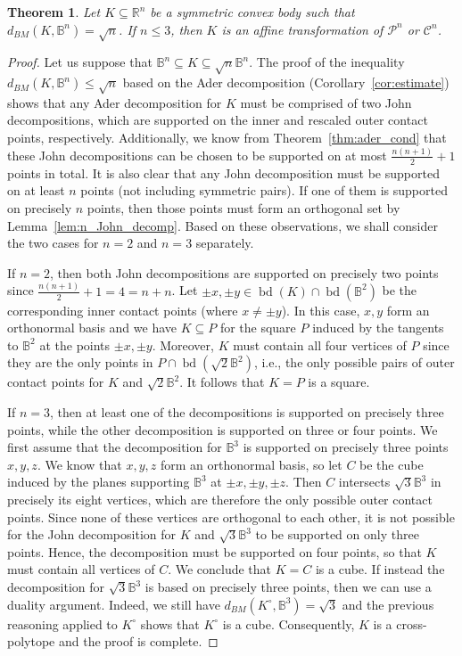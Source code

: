 \documentclass[12pt,a4paper]{article}
\newtheorem{twr}{Theorem}[section]
\theoremstyle{definition}
\DeclareMathOperator{\bd}{bd}
\newcommand\R{\mathbb{R}}
\newcommand\B{\mathbb{B}}
\newcommand\CC{\mathcal{C}}
\newcommand\CP{\mathcal{P}}
\begin{document}
\begin{twr}
\label{thm:eqcase}
Let $K \subseteq \R^n$ be a symmetric convex body such that $d_{BM}(K, \B^n)=\sqrt{n}$. If $n \leq 3$, then $K$ is an affine transformation of $\CP^n$ or $\CC^n$.
\end{twr}
\begin{proof}
Let us suppose that $\B^n \subseteq K \subseteq \sqrt{n}\B^n$. The proof of the inequality $d_{BM}(K,\B^n) \leq \sqrt{n}$ based on the Ader decomposition (Corollary~\ref{cor:estimate}) shows that any Ader decomposition for $K$ must be comprised of two John decompositions, which are supported on the inner and rescaled outer contact points, respectively. Additionally, we know from Theorem~\ref{thm:ader_cond} that these John decompositions can be chosen to be supported on at most $\frac{n(n+1)}{2} + 1$ points in total. It is also clear that any John decomposition must be supported on at least $n$ points (not including symmetric pairs). If one of them is supported on precisely $n$ points, then those points must form an orthogonal set by Lemma~\ref{lem:n_John_decomp}. Based on these observations, we shall consider the two cases for $n = 2$ and $n = 3$ separately.

If $n=2$, then both John decompositions are supported on precisely two points since $\frac{n(n+1)}{2} + 1 = 4 = n + n$. Let $\pm x, \pm y \in \bd(K) \cap \bd(\B^2)$ be the corresponding inner contact points (where $x \neq \pm y$). In this case, $x, y$ form an orthonormal basis and we have $K \subseteq P$ for the square $P$ induced by the tangents to $\B^2$ at the points $\pm x, \pm y$. Moreover, $K$ must contain all four vertices of $P$ since they are the only points in $P \cap \bd(\sqrt{2} \B^2)$, i.e., the only possible pairs of outer contact points for $K$ and $\sqrt{2}\B^2$. It follows that $K=P$ is a square.

If $n=3$, then at least one of the decompositions is supported on precisely three points, while the other decomposition is supported on three or four points. We first assume that the decomposition for $\B^3$ is supported on precisely three points $x,y,z$. We know that $x, y, z$ form an orthonormal basis, so let $C$ be the cube induced by the planes supporting $\B^3$ at $\pm x, \pm y, \pm z$. Then $C$ intersects $\sqrt{3} \B^3 $ in precisely its eight vertices, which are therefore the only possible outer contact points. Since none of these vertices are orthogonal to each other, it is not possible for the John decomposition for $K$ and $\sqrt{3}\B^3$ to be supported on only three points. Hence, the decomposition must be supported on four points, so that $K$ must contain all vertices of $C$. We conclude that $K = C$ is a cube. If instead the decomposition for $\sqrt{3}\B^3$ is based on precisely three points, then we can use a duality argument. Indeed, we still have $d_{BM}(K^\circ, \B^3) = \sqrt{3}$ and the previous reasoning applied to $K^\circ$ shows that $K^\circ$ is a cube. Consequently, $K$ is a cross-polytope and the proof is complete.
\end{proof}
\end{document}

